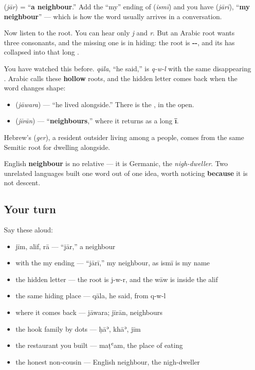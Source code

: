 \begin{cousinweb}
\textbf{} (\emph{jār}) = \textquotedblleft{}\textbf{a neighbour}.\textquotedblright{} Add the \textquotedblleft{}my\textquotedblright{} ending of \textbf{} (\emph{ismī}) and you have \textbf{} (\emph{jārī}), \textquotedblleft{}\textbf{my neighbour}\textquotedblright{} — which is how the word usually arrives in a conversation.

Now listen to the root. You can hear only \emph{j} and \emph{r}. But an Arabic root wants three consonants, and the missing one is in hiding: the root is \textbf{--}, and its \textbf{} has collapsed into that long \textbf{}.

You have watched this before. \emph{qāla}, \textquotedblleft{}he said,\textquotedblright{} is \emph{q-w-l} with the same disappearing \textbf{}. Arabic calls these \textbf{hollow} roots, and the hidden letter comes back when the word changes shape:

\begin{itemize}
\raggedright
  \item \textbf{} (\emph{jāwara}) — \textquotedblleft{}he lived alongside.\textquotedblright{} There is the \textbf{}, in the open.
  \item \textbf{} (\emph{jīrān}) — \textquotedblleft{}\textbf{neighbours},\textquotedblright{} where it returns as a long \textbf{ī}.
\end{itemize}

Hebrew's \textbf{} (\emph{ger}), a resident outsider living among a people, comes from the same Semitic root for dwelling alongside.

English \textbf{neighbour} is no relative — it is Germanic, the \emph{nigh-dweller}. Two unrelated languages built one word out of one idea, worth noticing \textbf{because} it is not descent.
\end{cousinweb}

\subsection*{Your turn}
Say these aloud:

\begin{itemize}
\raggedright
  \item jīm, alif, rā — \textquotedblleft{}jār,\textquotedblright{} a neighbour
  \item with the my ending — \textquotedblleft{}jārī,\textquotedblright{} my neighbour, as ismī is my name
  \item the hidden letter — the root is j-w-r, and the wāw is inside the alif
  \item the same hiding place — qāla, he said, from q-w-l
  \item where it comes back — jāwara; jīrān, neighbours
  \item the hook family by dots — ḥāʾ, khāʾ, jīm
  \item the restaurant you built — maṭʿam, the place of eating
  \item the honest non-cousin — English neighbour, the nigh-dweller
\end{itemize}

